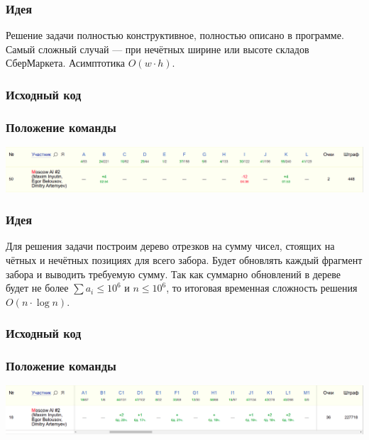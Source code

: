 \documentclass[12pt]{article}
\begin{document}

\subsubsection*{Идея}
Решение задачи полностью конструктивное, полностью описано в программе. Самый сложный случай --- при нечётных ширине или высоте складов СберМаркета. Асимптотика $O(w \cdot h)$.
\subsubsection*{Исходный код}

\subsubsection*{Положение команды}
\includegraphics[scale=0.25]{images/rucode.png}\newline\noindent
\pagebreak


\subsubsection*{Идея}
Для решения задачи построим дерево отрезков на сумму чисел, стоящих на чётных и нечётных позициях для всего забора. Будет обновлять каждый фрагмент забора и выводить требуемую сумму. Так как суммарно обновлений в дереве будет не более $\sum a_i \leqslant 10 ^ 6$ и $n \leqslant 10 ^ 6$, то итоговая временная сложность решения $O(n \cdot \log{n})$.
\subsubsection*{Исходный код}

\subsubsection*{Положение команды}
\includegraphics[scale=0.25]{images/mw1.png}\newline\noindent
\pagebreak
\end{document}
